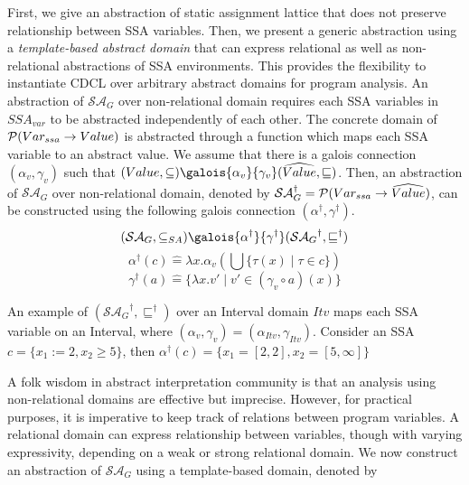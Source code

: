 First, we give an abstraction of static assignment lattice that does not
preserve relationship between SSA variables.  Then, we present a generic 
abstraction using a \emph{template-based abstract domain} that can express 
relational as well as non-relational abstractions of SSA environments.  
This provides the flexibility to instantiate CDCL over arbitrary abstract domains for 
program analysis.  
%
%
An abstraction of $\mathcal{SA}_G$ over non-relational domain requires each SSA
variables in $SSA_{var}$ to be abstracted independently of each other.  
The concrete domain of $\mathcal{P}(Var_{ssa} \rightarrow Value)$ is abstracted 
through a function which maps each SSA variable to an abstract value.  We 
assume that there is a galois connection $(\alpha_v,\gamma_v)$ such that
  $(Value, \subseteq)
   \galois{\alpha_{v}}{\gamma_{v}}
   (\widehat{Value}, \sqsubseteq)$.   
%
Then, an abstraction of $\mathcal{SA}_G$ over non-relational domain, denoted by
$\mathcal{SA}_G^\dagger = \mathcal{P}(Var_{ssa} \rightarrow \widehat{Value})$, 
can be constructed using the following galois connection 
$(\alpha^\dagger,\gamma^\dagger)$.
\[
   (\mathcal{SA}_{G},\subseteq_{SA})
   \galois{\alpha^\dagger}{\gamma^\dagger}
   ({\mathcal{SA}_{G}}^\dagger,\sqsubseteq^\dagger)
\]
\[
  \alpha^\dagger(c) \mathrel{\hat=} \lambda x.\alpha_v(\bigcup\{\tau(x) \mid \tau
  \in c\})
\]
\[
  \gamma^\dagger(a) \mathrel{\hat=} \{\lambda x.v' \mid v' \in (\gamma_v \circ
  a)(x)\}
\]
%
\begin{example}
%
An example of $({\mathcal{SA}_{G}}^\dagger,\sqsubseteq^\dagger)$ over an
Interval domain $Itv$ maps each SSA variable on an Interval, where 
$(\alpha_v,\gamma_v) = (\alpha_{Itv}, \gamma_{Itv})$.  Consider an SSA 
$c=\{x_1:=2, x_2 \geq 5\}$, then $\alpha^\dagger(c) = \{x_1=[2,2],x_2=[5,\infty]\}$
\end{example}
%
%
A folk wisdom in abstract interpretation community is that an analysis using 
non-relational domains are effective but imprecise. However, for practical
purposes, it is imperative to keep track of relations between program variables.  
A relational domain can express relationship between variables, though with varying
expressivity, depending on a weak or strong relational domain.  We now construct
an abstraction of $\mathcal{SA}_G$ using a template-based domain, denoted by 
